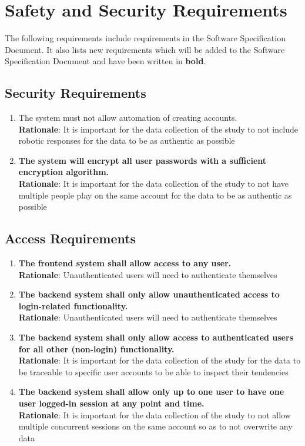 \documentclass{article}
\begin{document}
\section{Safety and Security Requirements}
The following requirements include requirements in the Software Specification Document. It also lists new requirements which will be added to the Software Specification Document and have been written in \textbf{bold}. 

\subsection{Security Requirements}
\begin{enumerate}[{SR}1. ]
    \item The system must not allow automation of creating accounts.\\
    \textbf{Rationale}: It is important for the data collection of the study to not include robotic responses for the data to be as authentic as possible 
    \item \textbf{The system will encrypt all user passwords with a sufficient encryption algorithm.}\\
    \textbf{Rationale}: It is important for the data collection of the study to not have multiple people play on the same account for the data to be as authentic as possible 
\end{enumerate}
\subsection{Access Requirements}
\begin{enumerate}[{ACR}1. ]
    \item \textbf{The frontend system shall allow access to any user.}\\
    \textbf{Rationale}: Unauthenticated users will need to authenticate themselves
    \item \textbf {The backend system shall only allow unauthenticated access to login-related functionality.}\\
    \textbf{Rationale}: Unauthenticated users will need to authenticate themselves
    \item \textbf{The backend system shall only allow access to authenticated users for all other (non-login) functionality.}\\
    \textbf{Rationale}: It is important for the data collection of the study for the data to be traceable to specific user accounts to be able to inspect their tendencies
    \item \textbf{The backend system shall allow only up to one user to have one user logged-in session at any point and time.}\\
    \textbf{Rationale}: It is important for the data collection of the study to not allow multiple concurrent sessions on the same account so as to not overwrite any data 
    
\end{enumerate}
\end{document}
